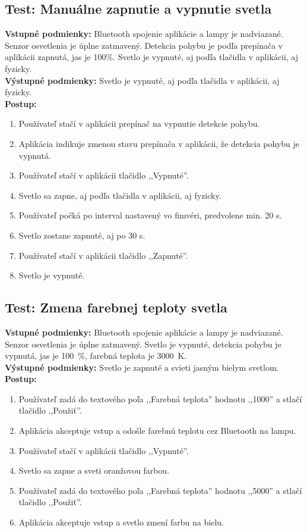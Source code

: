 \documentclass[12pt, a4paper]{article}
\begin{document}
\subsection{Test: Manuálne zapnutie a vypnutie svetla}
\noindent\textbf{Vstupné podmienky:} Bluetooth spojenie aplikácie a lampy je nadviazané. Senzor osvetlenia je úplne zatmavený. Detekcia pohybu je podľa prepínača v aplikácii zapnutá, jas je 100\%. Svetlo je vypnuté, aj podľa tlačidla v aplikácii, aj fyzicky. \\
\textbf{Výstupné podmienky:} Svetlo je vypnuté, aj podľa tlačidla v aplikácii, aj fyzicky. \\
\textbf{Postup:}
\begin{enumerate}
\itemsep0pt
\item Používateľ stačí v aplikácii prepínač na vypnutie detekcie pohybu.
\item Aplikácia indikuje zmenou stavu prepínača v aplikácii, že detekcia pohybu je vypnutá.
\item Používateľ stačí v aplikácii tlačidlo ,,Vypnuté''.
\item Svetlo sa zapne, aj podľa tlačidla v aplikácii, aj fyzicky.
\item Používateľ počká po interval nastavený vo fimvéri, predvolene min. 20 s.
\item Svetlo zostane zapnuté, aj po 30 s.
\item Používateľ stačí v aplikácii tlačidlo ,,Zapnuté''.
\item Svetlo je vypnuté.
\end{enumerate}

\subsection{Test: Zmena farebnej teploty svetla}
\noindent\textbf{Vstupné podmienky:} Bluetooth spojenie aplikácie a lampy je nadviazané. Senzor osvetlenia je úplne zatmavený. Svetlo je vypnuté, detekcia pohybu je vypnutá, jas je 100~\%, farebná teplota je 3000~K. \\
\textbf{Výstupné podmienky:} Svetlo je zapnuté a svieti jasným bielym svetlom. \\
\textbf{Postup:}
\begin{enumerate}
\itemsep0pt
\item Používateľ zadá do textového poľa ,,Farebná teplota'' hodnotu ,,1000'' a stlačí tlačidlo ,,Použiť''.
\item Aplikácia akceptuje vstup a odošle farebnú teplotu cez Bluetooth na lampu.
\item Používateľ stačí v aplikácii tlačidlo ,,Vypnuté''.
\item Svetlo sa zapne a sveti oranžovou farbou.
\item Používateľ zadá do textového poľa ,,Farebná teplota'' hodnotu ,,5000'' a stlačí tlačidlo ,,Použiť''.
\item Aplikácia akceptuje vstup a svetlo zmení farbu na bielu.
\end{enumerate}
\end{document}
